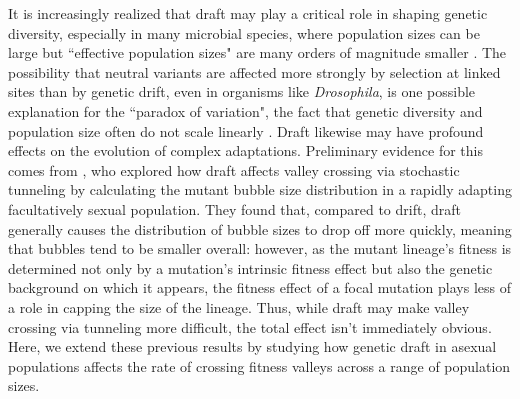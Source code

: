 \documentclass[rmp]{revtex4}
\begin{document}
\begin{spacing}{1.5}
It is increasingly realized that draft may play a critical role in shaping genetic diversity, especially in many microbial species, where population sizes can be large but ``effective population sizes" are many orders of magnitude smaller \citep{masel_2011}.
The possibility that neutral variants are affected more strongly by selection at linked sites than by genetic drift, even in organisms like \emph{Drosophila}, is one possible explanation for the ``paradox of variation", the fact that genetic diversity and population size often do not scale linearly \citep{gillespie_2000, gillespie_2001, neher_kessinger_2013, corbett-detig_2015}.
Draft likewise may have profound effects on the evolution of complex adaptations. Preliminary evidence for this comes from
\citet{neher_shraiman_2011}, who explored how draft affects valley crossing via stochastic tunneling by calculating the mutant bubble size distribution in a rapidly adapting facultatively sexual population.
They found that, compared to drift, draft generally causes the distribution of bubble sizes to drop off more quickly, meaning that bubbles tend to be smaller overall: however, as the mutant lineage's fitness is determined not only by a mutation's intrinsic fitness effect but also the genetic background on which it appears, the fitness effect of a focal mutation plays less of a role in capping the size of the lineage.
Thus, while draft may make valley crossing via tunneling more difficult, the total effect isn't immediately obvious.
Here, we extend these previous results by studying how genetic draft in asexual populations affects the rate of crossing fitness valleys across a range of population sizes.


\end{spacing}
\end{document}
